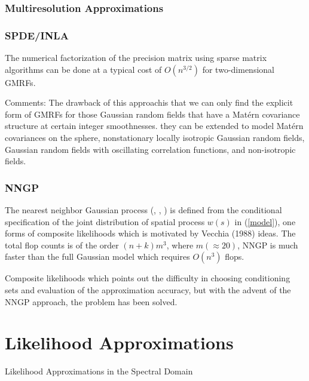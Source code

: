 \documentclass[
12pt, %
a4paper, %
oneside, %
headinclude,footinclude, %
BCOR5mm, %
]{scrartcl}
\begin{document}
\subsubsection{Multiresolution Approximations}
\subsubsection{SPDE/INLA}
The numerical factorization of the precision matrix using sparse matrix algorithms can be done at a typical cost of $O(n^{3/2})$ for two-dimensional GMRFs.

\textcolor[rgb]{1.00,0.00,1.00}{Comments:}
The drawback of this approachis that we can only find the explicit form of GMRFs for those Gaussian random fields that have a Matérn covariance structure at certain integer smoothnesses.  they can be extended to model Matérn covariances on the sphere, nonstationary locally isotropic Gaussian random fields, Gaussian random fields with oscillating correlation functions, and non-isotropic fields.


\subsubsection{NNGP}
The nearest neighbor Gaussian process (\href{https://chenyw68.github.io/Literature/[2016]Hierarchical nearest-neighbor Gaussian process models for large geostatistical datasets.pdf}{\cite{datta2016hierarchical}},
\href{https://chenyw68.github.io/Literature/[2016]Hierarchical nearest-neighbor Gaussian process models for large geostatistical datasets.pdf}{\cite{datta2016nonseparable}},
\href{https://chenyw68.github.io/Literature/[2016]Hierarchical nearest-neighbor Gaussian process models for large geostatistical datasets.pdf}{\cite{finley2019efficient}}
) is defined from the conditional specification of the joint distribution of spatial process $w(s)$ in (\ref{model}), one forms of composite likelihoods which is motivated by Vecchia (1988) ideas.  The total flop counts is of the order $(n + k)m^3$,
where $m (\approx 20)$, NNGP is much faster than the full Gaussian model which requires $O(n^3 )$ flops.

Composite likelihoods which points out the difficulty in choosing conditioning sets and  evaluation of the approximation accuracy, but with the advent of the NNGP approach, the problem has been solved.

\section{Likelihood Approximations}
Likelihood Approximations in the Spectral Domain
\end{document}
